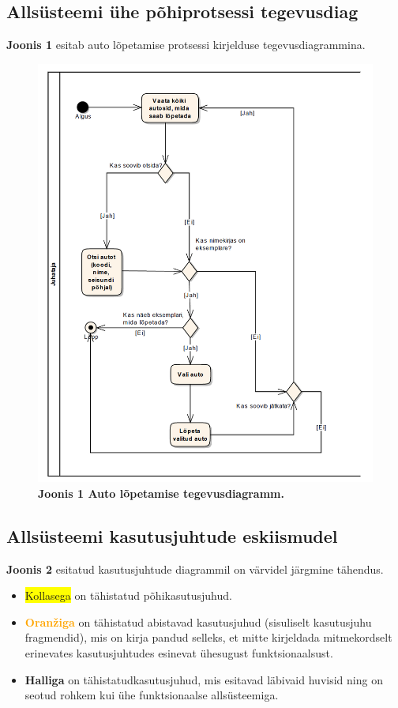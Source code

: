 \documentclass{report}
\begin{document}
\subsection{Allsüsteemi ühe põhiprotsessi tegevusdiag}

\textbf{Joonis 1} esitab auto lõpetamise protsessi kirjelduse tegevusdiagrammina. 
\begin{figure}[H]
	\includegraphics[scale=0.6]{joonis1}
	\caption{\textbf{Joonis 1 Auto lõpetamise tegevusdiagramm.}}
\end{figure}

\subsection{Allsüsteemi kasutusjuhtude eskiismudel}
\textbf{Joonis 2} esitatud kasutusjuhtude diagrammil on värvidel järgmine tähendus.

\begin{itemize}
	\item \colorbox{yellow}{Kollasega} on tähistatud põhikasutusjuhud.
	\item \textbf{\textcolor{orange}{Oranžiga}} on tähistatud abistavad kasutusjuhud (sisuliselt kasutusjuhu fragmendid), mis on kirja pandud selleks, et mitte kirjeldada mitmekordselt erinevates kasutusjuhtudes esinevat ühesugust funktsionaalsust.
	\item \textbf{\colorbox{light-gray}{Halliga}} on tähistatudkasutusjuhud, mis esitavad läbivaid huvisid ning on seotud rohkem kui ühe funktsionaalse allsüsteemiga.
\end{itemize}
\end{document}
